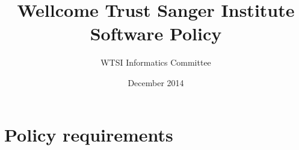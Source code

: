 \documentclass[10pt,a4paper]{article}
\begin{document}
\title{
Wellcome Trust Sanger Institute \\
Software Policy
}
\author{WTSI Informatics Committee}
\date{December 2014}

\maketitle

\newcommand{\exectitle}[0]{Chief Operating Officer}

\newcommand{\execperson}[0]{Martin Dougherty} 

\newcommand{\filename}[1]{\texttt{#1}} 

\newenvironment{boilerplate}[1][]
  {\minipage{\linewidth}%
   \lstset{basicstyle=\ttfamily\footnotesize,breaklines=false,frame=shadowbox,rulesepcolor=\color{blue},#1}}
   {\endminipage}%

\setlength{\parindent}{0pt} %

\setlength{\parskip}{4mm plus2mm minus2mm}

\let\stdsection\section
\renewcommand\section{\newpage\stdsection}




\section{Policy requirements}
\label{section:policy}

\end{document}
